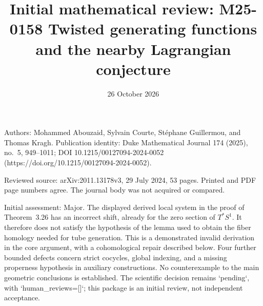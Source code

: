 \documentclass[10pt]{article}
\title{Initial mathematical review: M25-0158
Twisted generating functions and the nearby Lagrangian conjecture}
\author{}
\date{26 October 2026}
\begin{document}
\maketitle
Authors: Mohammed Abouzaid, Sylvain Courte, Stéphane Guillermou, and Thomas Kragh. Publication identity: Duke Mathematical Journal 174 (2025), no. 5, 949–1011; DOI 10.1215/00127094-2024-0052 (https://doi.org/10.1215/00127094-2024-0052).\par
Reviewed source: arXiv:2011.13178v3, 29 July 2024, 53 pages. Printed and PDF page numbers agree. The journal body was not acquired or compared.\par
Initial assessment: Major. The displayed derived local system in the proof of Theorem 3.26 has an incorrect shift, already for the zero section of \(T^*S^1\). It therefore does not satisfy the hypothesis of the lemma used to obtain the fiber homology needed for tube generation. This is a demonstrated invalid derivation in the core argument, with a cohomological repair described below. Four further bounded defects concern strict cocycles, global indexing, and a missing properness hypothesis in auxiliary constructions. No counterexample to the main geometric conclusions is established. The scientific decision remains `pending`, with `human\_reviews=[]`; this package is an initial review, not independent acceptance.\par
\end{document}
